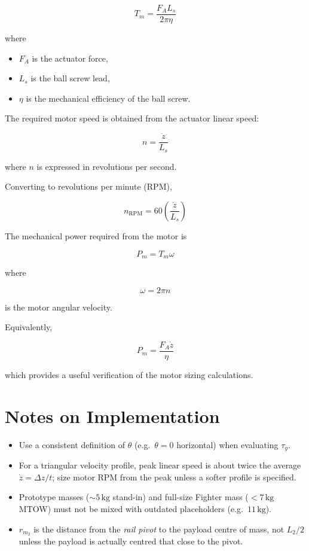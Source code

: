\documentclass[11pt]{article}
\begin{document}
\[
    \boxed{
        T_m = \frac{F_A L_s}{2\pi\eta}
    }
\]

where
\begin{itemize}
    \item $F_A$ is the actuator force,
    \item $L_s$ is the ball screw lead,
    \item $\eta$ is the mechanical efficiency of the ball screw.
\end{itemize}

The required motor speed is obtained from the actuator linear speed:

\[
    \boxed{
        n = \frac{\dot{z}}{L_s}
    }
\]

where $n$ is expressed in revolutions per second.

Converting to revolutions per minute (RPM),

\[
    \boxed{
        n_{\mathrm{RPM}} = 60\left(\frac{\dot{z}}{L_s}\right)
    }
\]

The mechanical power required from the motor is

\[
    \boxed{
        P_m = T_m\omega
    }
\]

where

\[
    \omega = 2\pi n
\]

is the motor angular velocity.

Equivalently,

\[
    \boxed{
        P_m = \frac{F_A\dot{z}}{\eta}
    }
\]

which provides a useful verification of the motor sizing calculations.


\section{Notes on Implementation}

\begin{itemize}
    \item Use a consistent definition of $\theta$ (e.g.\ $\theta=0$ horizontal) when evaluating $\tau_g$.
    \item For a triangular velocity profile, peak linear speed is about twice the average $\dot{z}=\Delta z/t$; size motor RPM from the peak unless a softer profile is specified.
    \item Prototype masses ($\sim 5\,\mathrm{kg}$ stand-in) and full-size Fighter mass ($<7\,\mathrm{kg}$ MTOW) must not be mixed with outdated placeholders (e.g.\ $11\,\mathrm{kg}$).
    \item $r_{m_2}$ is the distance from the \emph{rail pivot} to the payload centre of mass, not $L_2/2$ unless the payload is actually centred that close to the pivot.
\end{itemize}
\end{document}
